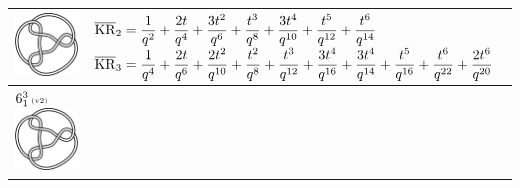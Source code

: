\documentclass{compositio}
\theoremstyle{definition}
\numberwithin{equation}{section}
\begin{document}
{\begin{longtable}{p{}|p{}}
\includegraphics[scale=0.07,angle=0]{link6_1_3.pdf} 
& 
$
\displaystyle{%
\overline{\KR}_{2} = \frac{1}{q^2}+\frac{2 t}{q^4}+\frac{3 t^2}{q^6}+\frac{t^3}{q^8}+\frac{3 t^4}{q^{10}}+\frac{t^5}{q^{12}}+\frac{t^6}{q^{14}}
}
$
\newline 
$
\displaystyle{%
\overline{\KR}_{3} = \frac{1}{q^4}+\frac{2 t}{q^6}+\frac{2 t^2}{q^{10}}+\frac{t^2}{q^8}+\frac{t^3}{q^{12}}+\frac{3 t^4}{q^{16}}+\frac{3 t^4}{q^{14}}+\frac{t^5}{q^{16}}+\frac{t^6}{q^{22}}+\frac{2 t^6}{q^{20}}
}
$
\\
\hline
$6_{1}^3\,\text{{\tiny (v2)}}$ 
\includegraphics[scale=0.07,angle=0]{link6_1_3.pdf} 

\end{longtable}}
\end{document}
